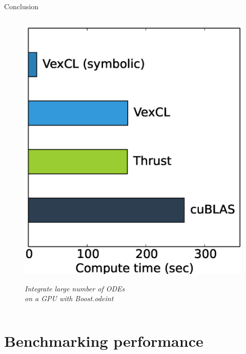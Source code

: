 \documentclass[@BEAMER_OPTIONS@]{beamer}
\begin{document}
\begin{frame}[label=conclusion]{Conclusion}
\begin{columns}
\begin{column}{0.45\textwidth}
\begin{figure}
\begin{center}
                \includegraphics[width=\textwidth]{perfplot}

                \vspace{\baselineskip}
                {\small \sl
                    Integrate large number of ODEs\\
                    on a GPU with Boost.odeint
                }
            \end{center}
            \end{figure}
        \end{column}
    \end{columns}

\end{frame}

\note{}

\appendix

\section{Benchmarking performance}
\begin{frame}
    \sectionpage
\end{frame}
\end{document}
